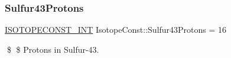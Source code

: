 \subsubsection{\texorpdfstring{Sulfur43\+Protons}{Sulfur43Protons}}
{\footnotesize\ttfamily \mbox{\hyperlink{group___isotope_const-_macros_ga5f18360b3e99483a35c32d789e62621c}{I\+S\+O\+T\+O\+P\+E\+C\+O\+N\+S\+T\+\_\+\+I\+NT}} Isotope\+Const\+::\+Sulfur43\+Protons = 16}

\$ \$ Protons in Sulfur-\/43. 